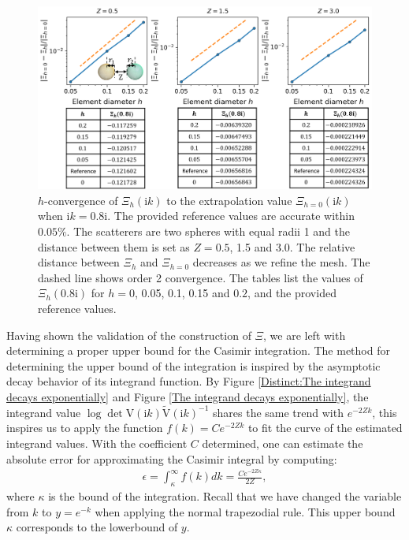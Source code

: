 \begin{figure}[H]
    \centering
    \includegraphics[width = \textwidth]{figures/Scalar_Xi_h_conv.png}
    \caption{$h$-convergence of $\Xi_{h}(\mathrm{i}k)$ to the extrapolation value $\Xi_{h = 0}(\mathrm{i}k)$ when $\mathrm{i}k = 0.8\mathrm{i}$. The provided reference values are accurate within $0.05\%$. The scatterers are two spheres with equal radii 1 and the distance between them is set as $Z = 0.5$, 1.5 and 3.0.
    The relative distance between $\Xi_{h}$ and $\Xi_{h = 0}$ decreases as we refine the mesh. The dashed line shows order 2 convergence. The tables list the values of $\Xi_{h}(0.8\mathrm{i})$ for $h = 0$, 0.05, 0.1, 0.15 and $0.2$, and the provided reference values.}
    \label{Scalar_Xi_h_conv}
\end{figure}

 Having shown the validation of the construction of $\Xi$, we are left with determining a proper upper bound for the Casimir integration. 
 The method for determining the upper bound of the integration is inspired by the asymptotic decay behavior of its integrand function.  
 By Figure \ref{Distinct:The integrand decays exponentially} and Figure \ref{The integrand decays exponentially}, the integrand value $\log\det\mathrm{V}(\mathrm{i}k)\tilde{\mathrm{V}}(\mathrm{i}k)^{-1}$ shares the same trend with $e^{-2Zk}$, this inspires us to apply the function $f(k) = Ce^{-2Zk}$ to fit the curve of the estimated integrand
 values. With the coefficient $C$ determined, one can estimate the absolute error for approximating the Casimir integral by computing:  
 \begin{align} \label{determine ub}
     \epsilon = \int_{\kappa}^{\infty}f(k)dk = \frac{Ce^{-2Z\kappa}}{2Z},
 \end{align}
 where $\kappa$ is the  bound of the integration. Recall that we have changed the variable from $k$ to $y = e^{-k}$ when applying the normal trapezodial rule. This upper bound $\kappa$ corresponds to the lowerbound of $y$.
 

